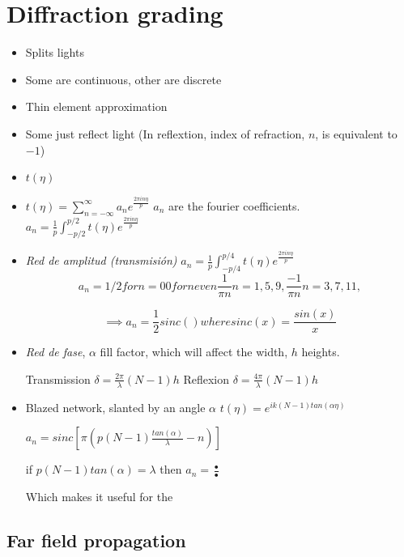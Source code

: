 \documentclass[../main/main.tex]{subfiles}
\begin{document}
\section{Diffraction grading}

\begin{itemize}
	\item Splits lights
	\item Some are continuous, other are discrete 
	\item Thin element approximation
	\item Some just reflect light (In reflextion, index of refraction, $n$, is equivalent to $-1$)
	\item $t(\eta)$
	\item $t(\eta) = \sum_{n=-\infty}^{\infty} a_{n}e^{\frac{2\pi i n \eta}{p}}$
	$a_{n}$ are the fourier coefficients. $a_{n} = \frac{1}{p}\int_{-p/2}^{p/2} t(\eta)e^{\frac{2\pi i n \eta}{p}}$
	\item \emph{Red de amplitud (transmisión)} $a_{n} =  \frac{1}{p}\int_{-p/4}^{p/4} t(\eta)e^{\frac{2\pi i n \eta}{p}}$
	\begin{equation}
	a_{n} = 1/2 for n = 0
	0 for n even
	\frac{1}{\pi n} n = 1, 5, 9, 
	\frac{-1}{\pi n} n = 3, 7, 11, 
	\end{equation}
	
	\begin{equation}
	\implies a_{n} = \frac{1}{2} sinc()   where sinc(x) = \frac{sin(x)}{x}
	\end{equation}
	
	\item \emph{Red de fase}, $\alpha$ fill factor, which will affect the width, $h$ heights.
	
	Transmission $\delta =  \frac{2 \pi }{\lambda} (N-1)h$ 
	Reflexion $\delta =  \frac{4 \pi }{\lambda} (N-1)h$ 
	\item Blazed network, slanted by an angle $\alpha$
	$t(\eta) = e^{i k (N-1) tan (\alpha \eta)}$
	
	$a_{n} = sinc\left[\pi \left(p (N-1) \frac{tan (\alpha)}{\lambda} - n\right)\right]$
	
	if $p(N-1) tan(\alpha) = \lambda$ then $a_{n} = \frac{•}{•}$
	
	Which makes it useful for the 
	
\end{itemize}

\subsection{Far field propagation}
\end{document}
